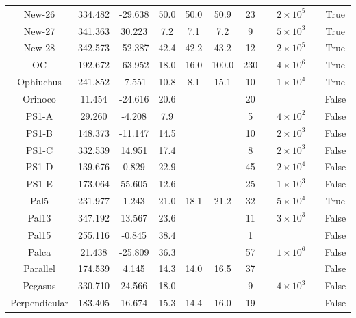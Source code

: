 \begin{table}
\begin{tabular}{ccccccccccc}
New-26 & 334.482 & -29.638 & 50.0 & 50.0 & 50.9 & 23 & \citet{ibata:2023} & $2 \times 10^{5}$ &  & True \\
New-27 & 341.363 & 30.223 & 7.2 & 7.1 & 7.2 & 9 & \citet{ibata:2023} & $5 \times 10^{3}$ &  & True \\
New-28 & 342.573 & -52.387 & 42.4 & 42.2 & 43.2 & 12 & \citet{ibata:2023} & $2 \times 10^{5}$ &  & True \\
OC & 192.672 & -63.952 & 18.0 & 16.0 & 100.0 & 230 & \citet{koposov:2019} & $4 \times 10^{6}$ & \citet{koposov:2019} & True \\
Ophiuchus & 241.852 & -7.551 & 10.8 & 8.1 & 15.1 & 10 & \citet{ibata:2023} & $1 \times 10^{4}$ &  & True \\
Orinoco & 11.454 & -24.616 & 20.6 & & & 20 & \citet{grillmair:2017} & &  & False \\
PS1-A & 29.260 & -4.208 & 7.9 & & & 5 & \citet{bernard:2016} & $4 \times 10^{2}$ & \citet{bernard:2016} & False \\
PS1-B & 148.373 & -11.147 & 14.5 & & & 10 & \citet{bernard:2016} & $2 \times 10^{3}$ & \citet{bernard:2016} & False \\
PS1-C & 332.539 & 14.951 & 17.4 & & & 8 & \citet{bernard:2016} & $2 \times 10^{3}$ & \citet{bernard:2016} & False \\
PS1-D & 139.676 & 0.829 & 22.9 & & & 45 & \citet{bernard:2016} & $2 \times 10^{4}$ & \citet{bernard:2016} & False \\
PS1-E & 173.064 & 55.605 & 12.6 & & & 25 & \citet{bernard:2016} & $1 \times 10^{3}$ & \citet{bernard:2016} & False \\
Pal5 & 231.977 & 1.243 & 21.0 & 18.1 & 21.2 & 32 & \citet{ibata:2023} & $5 \times 10^{4}$ &  & True \\
Pal13 & 347.192 & 13.567 & 23.6 & & & 11 & \citet{shipp:2020} & $3 \times 10^{3}$ & \citet{shipp:2020} & False \\
Pal15 & 255.116 & -0.845 & 38.4 & & & 1 & \citet{myeong:2017} & &  & False \\
Palca & 21.438 & -25.809 & 36.3 & & & 57 & \citet{shipp:2018} & $1 \times 10^{6}$ & \citet{thomas:2022} & False \\
Parallel & 174.539 & 4.145 & 14.3 & 14.0 & 16.5 & 37 & \citet{weiss:2018} & &  & False \\
Pegasus & 330.710 & 24.566 & 18.0 & & & 9 & \citet{perottoni:2019} & $4 \times 10^{3}$ & \citet{perottoni:2019} & False \\
Perpendicular & 183.405 & 16.674 & 15.3 & 14.4 & 16.0 & 19 & \citet{weiss:2018} & &  & False \\

\end{tabular}
\end{table}
